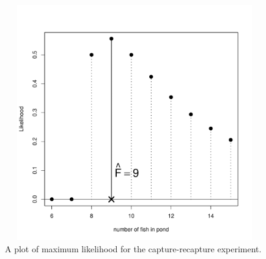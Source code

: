 \documentclass[captions=tableheading]{scrbook}
\begin{document}
\begin{figure}[th]
    \includegraphics[width=5in, height=4in]{img/capture-recapture.pdf}
    \caption[Capture-recapture experiment]{\small A plot of maximum likelihood for the capture-recapture experiment.}
    \label{fig:capture-recapture}
  \end{figure}
\end{document}
